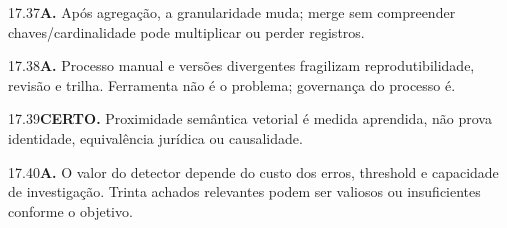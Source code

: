 \begin{solucao}{17.37}\textbf{A.} Após agregação, a granularidade muda; merge sem compreender chaves/cardinalidade pode multiplicar ou perder registros.\end{solucao}
\begin{solucao}{17.38}\textbf{A.} Processo manual e versões divergentes fragilizam reprodutibilidade, revisão e trilha. Ferramenta não é o problema; governança do processo é.\end{solucao}
\begin{solucao}{17.39}\textbf{CERTO.} Proximidade semântica vetorial é medida aprendida, não prova identidade, equivalência jurídica ou causalidade.\end{solucao}
\begin{solucao}{17.40}\textbf{A.} O valor do detector depende do custo dos erros, threshold e capacidade de investigação. Trinta achados relevantes podem ser valiosos ou insuficientes conforme o objetivo.\end{solucao}

